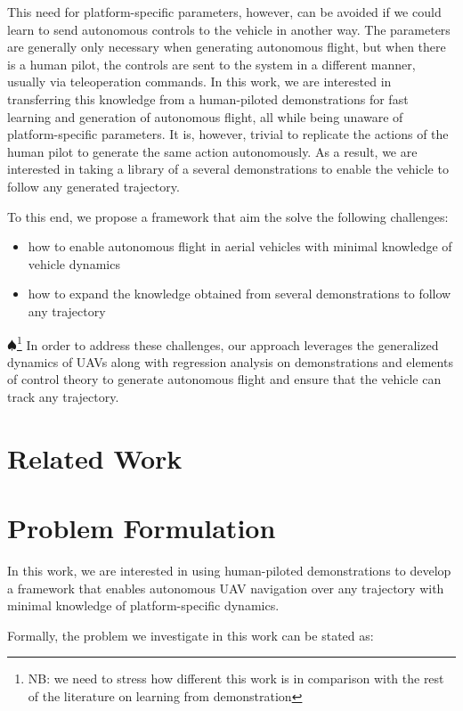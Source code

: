 \documentclass[letterpaper, 10 pt, conference]{ieeeconf}  %
\newcommand\NB[1]{$\spadesuit$\footnote{NB: #1}}
\begin{document}
This need for platform-specific parameters, however, can be avoided if we could learn to send autonomous controls to the vehicle in another way. The parameters are generally only necessary when generating autonomous flight, but when there is a human pilot, the controls are sent to the system in a different manner, usually via teleoperation commands. In this work, we are interested in transferring this knowledge from a human-piloted demonstrations for fast learning and generation of autonomous flight, all while being unaware of platform-specific parameters. It is, however, trivial to replicate the actions of the human pilot to generate the same action autonomously. As a result, we are interested in taking a library of a several demonstrations to enable the vehicle to follow any generated trajectory.

To this end, we propose a framework that aim the solve the following challenges:
\begin{itemize}
    \item how to enable autonomous flight in aerial vehicles with minimal knowledge of vehicle dynamics
    \item how to expand the knowledge obtained from several demonstrations to follow any trajectory
\end{itemize}
\NB{we need to stress how different this work is in comparison with the rest of the literature on learning from demonstration}
In order to address these challenges, our approach leverages the generalized dynamics of UAVs along with regression analysis on demonstrations and elements of control theory to generate autonomous flight and ensure that the vehicle can track any trajectory.


\section{Related Work}


\section{Problem Formulation}
In this work, we are interested in using human-piloted demonstrations to develop a framework that enables autonomous UAV navigation over any trajectory with minimal knowledge of platform-specific dynamics.

Formally, the problem we investigate in this work can be stated as:
\end{document}

